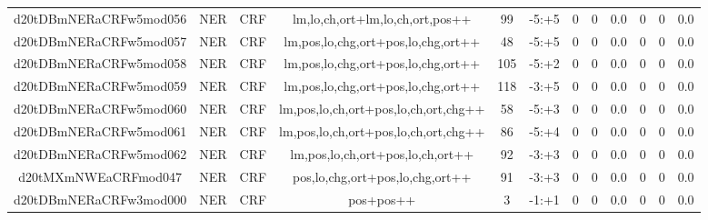 \documentclass[a4paper]{article}
\begin{document}
\begin{landscape}
\begin{center}
\begin{tabular}{ |c|c|c|c|c|c|c|c|c|c|c|c|}
 	

 
 	
 	\small{ d20tDBmNERaCRFw5mod056 } & \small{ NER} & \small{  CRF }  & lm,lo,ch,ort+lm,lo,ch,ort,pos++  &  99 &  \small{  -5:+5 }  &  0 & 0 & 0.0  &  0 & 0 & 0.0 \\
 	

 
 	
 	\small{ d20tDBmNERaCRFw5mod057 } & \small{ NER} & \small{  CRF }  & lm,pos,lo,chg,ort+pos,lo,chg,ort++  &  48 &  \small{  -5:+5 }  &  0 & 0 & 0.0  &  0 & 0 & 0.0 \\
 	

 
 	
 	\small{ d20tDBmNERaCRFw5mod058 } & \small{ NER} & \small{  CRF }  & lm,pos,lo,chg,ort+pos,lo,chg,ort++  &  105 &  \small{  -5:+2 }  &  0 & 0 & 0.0  &  0 & 0 & 0.0 \\
 	

 
 	
 	\small{ d20tDBmNERaCRFw5mod059 } & \small{ NER} & \small{  CRF }  & lm,pos,lo,chg,ort+pos,lo,chg,ort++  &  118 &  \small{  -3:+5 }  &  0 & 0 & 0.0  &  0 & 0 & 0.0 \\
 	

 
 	
 	\small{ d20tDBmNERaCRFw5mod060 } & \small{ NER} & \small{  CRF }  & lm,pos,lo,ch,ort+pos,lo,ch,ort,chg++  &  58 &  \small{  -5:+3 }  &  0 & 0 & 0.0  &  0 & 0 & 0.0 \\
 	

 
 	
 	\small{ d20tDBmNERaCRFw5mod061 } & \small{ NER} & \small{  CRF }  & lm,pos,lo,ch,ort+pos,lo,ch,ort,chg++  &  86 &  \small{  -5:+4 }  &  0 & 0 & 0.0  &  0 & 0 & 0.0 \\
 	

 
 	
 	\small{ d20tDBmNERaCRFw5mod062 } & \small{ NER} & \small{  CRF }  & lm,pos,lo,ch,ort+pos,lo,ch,ort++  &  92 &  \small{  -3:+3 }  &  0 & 0 & 0.0  &  0 & 0 & 0.0 \\
 	

 
 	
 	\small{ d20tMXmNWEaCRFmod047 } & \small{ NER} & \small{  CRF }  & pos,lo,chg,ort+pos,lo,chg,ort++  &  91 &  \small{  -3:+3 }  &  0 & 0 & 0.0  &  0 & 0 & 0.0 \\
 	

 
 	
 	\small{ d20tDBmNERaCRFw3mod000 } & \small{ NER} & \small{  CRF }  & pos+pos++  &  3 &  \small{  -1:+1 }  &  0 & 0 & 0.0  &  0 & 0 & 0.0 \\
 	


\end{tabular}
\end{center}
\end{landscape}
\end{document}

